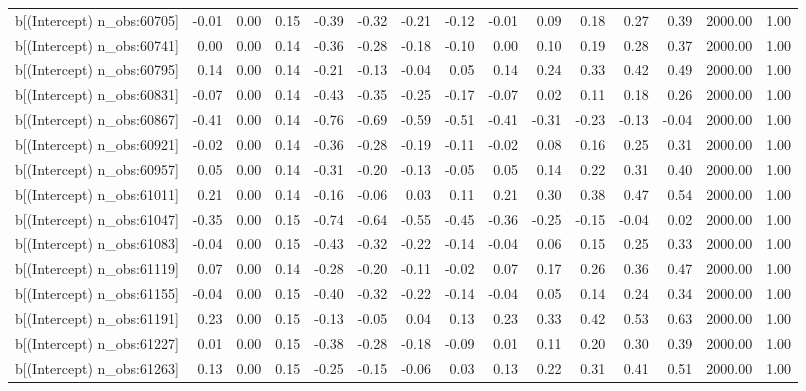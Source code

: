 \begin{table}[ht]
\begin{tabular}{rrrrrrrrrrrrrrr}
  b[(Intercept) n\_obs:60705] & -0.01 & 0.00 & 0.15 & -0.39 & -0.32 & -0.21 & -0.12 & -0.01 & 0.09 & 0.18 & 0.27 & 0.39 & 2000.00 & 1.00 \\ 
  b[(Intercept) n\_obs:60741] & 0.00 & 0.00 & 0.14 & -0.36 & -0.28 & -0.18 & -0.10 & 0.00 & 0.10 & 0.19 & 0.28 & 0.37 & 2000.00 & 1.00 \\ 
  b[(Intercept) n\_obs:60795] & 0.14 & 0.00 & 0.14 & -0.21 & -0.13 & -0.04 & 0.05 & 0.14 & 0.24 & 0.33 & 0.42 & 0.49 & 2000.00 & 1.00 \\ 
  b[(Intercept) n\_obs:60831] & -0.07 & 0.00 & 0.14 & -0.43 & -0.35 & -0.25 & -0.17 & -0.07 & 0.02 & 0.11 & 0.18 & 0.26 & 2000.00 & 1.00 \\ 
  b[(Intercept) n\_obs:60867] & -0.41 & 0.00 & 0.14 & -0.76 & -0.69 & -0.59 & -0.51 & -0.41 & -0.31 & -0.23 & -0.13 & -0.04 & 2000.00 & 1.00 \\ 
  b[(Intercept) n\_obs:60921] & -0.02 & 0.00 & 0.14 & -0.36 & -0.28 & -0.19 & -0.11 & -0.02 & 0.08 & 0.16 & 0.25 & 0.31 & 2000.00 & 1.00 \\ 
  b[(Intercept) n\_obs:60957] & 0.05 & 0.00 & 0.14 & -0.31 & -0.20 & -0.13 & -0.05 & 0.05 & 0.14 & 0.22 & 0.31 & 0.40 & 2000.00 & 1.00 \\ 
  b[(Intercept) n\_obs:61011] & 0.21 & 0.00 & 0.14 & -0.16 & -0.06 & 0.03 & 0.11 & 0.21 & 0.30 & 0.38 & 0.47 & 0.54 & 2000.00 & 1.00 \\ 
  b[(Intercept) n\_obs:61047] & -0.35 & 0.00 & 0.15 & -0.74 & -0.64 & -0.55 & -0.45 & -0.36 & -0.25 & -0.15 & -0.04 & 0.02 & 2000.00 & 1.00 \\ 
  b[(Intercept) n\_obs:61083] & -0.04 & 0.00 & 0.15 & -0.43 & -0.32 & -0.22 & -0.14 & -0.04 & 0.06 & 0.15 & 0.25 & 0.33 & 2000.00 & 1.00 \\ 
  b[(Intercept) n\_obs:61119] & 0.07 & 0.00 & 0.14 & -0.28 & -0.20 & -0.11 & -0.02 & 0.07 & 0.17 & 0.26 & 0.36 & 0.47 & 2000.00 & 1.00 \\ 
  b[(Intercept) n\_obs:61155] & -0.04 & 0.00 & 0.15 & -0.40 & -0.32 & -0.22 & -0.14 & -0.04 & 0.05 & 0.14 & 0.24 & 0.34 & 2000.00 & 1.00 \\ 
  b[(Intercept) n\_obs:61191] & 0.23 & 0.00 & 0.15 & -0.13 & -0.05 & 0.04 & 0.13 & 0.23 & 0.33 & 0.42 & 0.53 & 0.63 & 2000.00 & 1.00 \\ 
  b[(Intercept) n\_obs:61227] & 0.01 & 0.00 & 0.15 & -0.38 & -0.28 & -0.18 & -0.09 & 0.01 & 0.11 & 0.20 & 0.30 & 0.39 & 2000.00 & 1.00 \\ 
  b[(Intercept) n\_obs:61263] & 0.13 & 0.00 & 0.15 & -0.25 & -0.15 & -0.06 & 0.03 & 0.13 & 0.22 & 0.31 & 0.41 & 0.51 & 2000.00 & 1.00 \\ 

\end{tabular}
\end{table}
